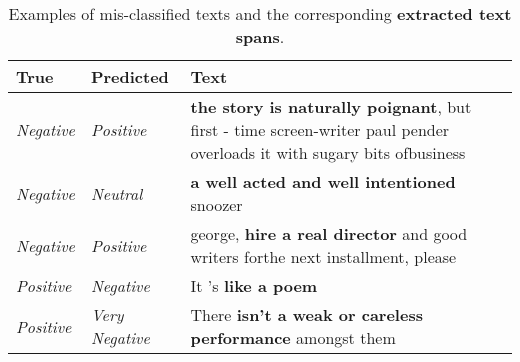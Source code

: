\documentclass[11pt,a4paper]{article}
\begin{document}
\begin{table*}[t]
  \centering
  \small
  \begin{tabular}{llp{11.5cm}}
  \toprule
  {\bf True} & {\bf Predicted} & {\bf Text} \\
   \midrule
   {\it Negative} & {\it Positive} & {{\bf the story is naturally poignant}, but first - time screen-writer paul pender overloads it with sugary bits ofbusiness}\\
   {\it Negative} & {\it Neutral} & {{\bf a well acted and well intentioned} snoozer}\\
   {\it Negative} & {\it Positive} & {george, {\bf hire a real director} and good writers forthe next installment, please}\\
   {\it Positive} & {\it Negative} & {It 's {\bf like a poem}}\\
   {\it Positive} & {\it Very Negative} & {There {\bf isn't a weak or careless performance} amongst them}\\
   \bottomrule
  \end{tabular}
  \caption{Examples of mis-classified texts and the corresponding {\bf extracted text spans}.}
  \label{tab:error}
\end{table*}
\end{document}
